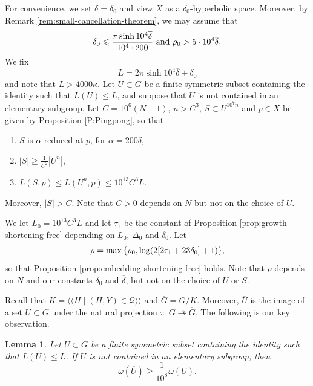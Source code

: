 \documentclass[leqno,a4paper,10pt]{amsart}
\theoremstyle{plain}
\newtheorem{lem}[thm]{Lemma}
\theoremstyle{definition}
\theoremstyle{remark}
\newcommand{\q}[1]{\overline{#1}}
\newcommand{\scrQ}{\mathscr{Q}}
\let\le\leqslant
\let\ge\geqslant
\newcommand{\lnormal}{%
	\langle\!\langle%
}
\newcommand{\rnormal}{%
	\rangle\!\rangle%
}
\newcommand{\normal}[1]{%
	\lnormal #1 \rnormal
}
\newcommand{\onto}{\twoheadrightarrow}
\begin{document}
 For convenience, we set $\delta=\delta_0$ and view $X$ as a $\delta_0$-hyperbolic space. Moreover, by Remark \ref{rem:small-cancellation-theorem}, we may assume that $$\delta_0\le\frac{\pi\sinh 10^4\q\delta}{10^4\cdot 200} \hbox{ and } \rho_0>5\cdot 10^4\q\delta.$$
  We fix $$L= 2\pi \sinh 10^4\q\delta+\delta_0$$ and note that $L>4000 \kappa$. Let $U\subset G$ be a finite symmetric subset containing the identity such that $L(U)\le L$, and suppose that $U$ is not contained in an elementary subgroup.  
 Let $C=10^6(N+1)$, $n>C^3$, $S\subset U^{10^7n}$ and $p\in X$ be given by  Proposition \ref{P:Pingpong}, so that  
\begin{enumerate}
\item $S$ is $\alpha$-reduced at $p$, for $\alpha=200\delta$,
\item $|S| \geqslant \frac{1}{C^2}|U^n|$,
\item $L(S,p)\le L(U^n,p)\leqslant 10^{13} C^3 L$.
\end{enumerate}
Moreover, $|S|>C$. Note that $C>0$ depends on $N$ but not on the choice of $U$.  
 
 We let $L_0=10^{13} C^3 L$ and let $\tau_1$  be the constant of Proposition \ref{prop:growth shortening-free} depending on $L_0$, $\Delta_0$ and $\delta_0$. Let
\begin{align}
 \rho = \max\qty {\rho_0,\log(2[2\tau_1+23\delta_0]+1)}, \label{E:choice-of-rho}
 \end{align}
so that Proposition \ref{prop:embedding shortening-free} holds.
Note that $\rho$ depends on $N$ and our constants $\delta_0$ and $\overline \delta$, but not on the choice of $U$ or $S$. 

Recall that  $K=\normal{H\mid (H,Y)\in \scrQ}$ and $\q G= G/K$. Moreover, $\q U$ is the image of a  set $U\subset G$ under the natural projection $\pi\colon G\onto \q G$. The following is our key observation. 

\begin{lem}
\label{lem:small-energy}
Let $U\subset G$ be a finite symmetric subset containing the identity such that $L(U)\le L$. If $U$ is not contained in an elementary subgroup, then 
$$\omega(\q U)\ge \frac{1}{10^8} \omega(U).$$
\end{lem}
\end{document}
